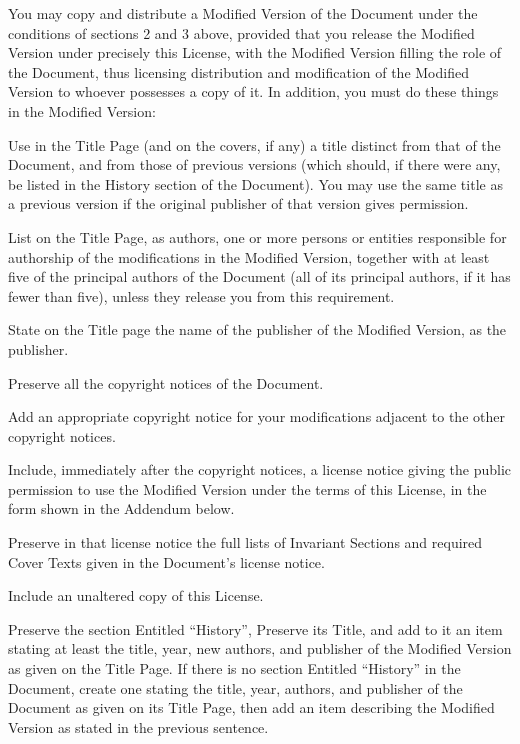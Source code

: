 You may copy and distribute a Modified Version of the Document under
the conditions of sections 2 and 3 above, provided that you release
the Modified Version under precisely this License, with the Modified
Version filling the role of the Document, thus licensing distribution
and modification of the Modified Version to whoever possesses a copy
of it.  In addition, you must do these things in the Modified Version:

\begin{itemize*}
\item[A.] 
   Use in the Title Page (and on the covers, if any) a title distinct
   from that of the Document, and from those of previous versions
   (which should, if there were any, be listed in the History section
   of the Document).  You may use the same title as a previous version
   if the original publisher of that version gives permission.
   
\item[B.]
   List on the Title Page, as authors, one or more persons or entities
   responsible for authorship of the modifications in the Modified
   Version, together with at least five of the principal authors of the
   Document (all of its principal authors, if it has fewer than five),
   unless they release you from this requirement.
   
\item[C.]
   State on the Title page the name of the publisher of the
   Modified Version, as the publisher.
   
\item[D.]
   Preserve all the copyright notices of the Document.
   
\item[E.]
   Add an appropriate copyright notice for your modifications
   adjacent to the other copyright notices.
   
\item[F.]
   Include, immediately after the copyright notices, a license notice
   giving the public permission to use the Modified Version under the
   terms of this License, in the form shown in the Addendum below.
   
\item[G.]
   Preserve in that license notice the full lists of Invariant Sections
   and required Cover Texts given in the Document's license notice.
   
\item[H.]
   Include an unaltered copy of this License.
   
\item[I.]
   Preserve the section Entitled ``History'', Preserve its Title, and add
   to it an item stating at least the title, year, new authors, and
   publisher of the Modified Version as given on the Title Page.  If
   there is no section Entitled ``History'' in the Document, create one
   stating the title, year, authors, and publisher of the Document as
   given on its Title Page, then add an item describing the Modified
   Version as stated in the previous sentence.
   

\end{itemize*}
